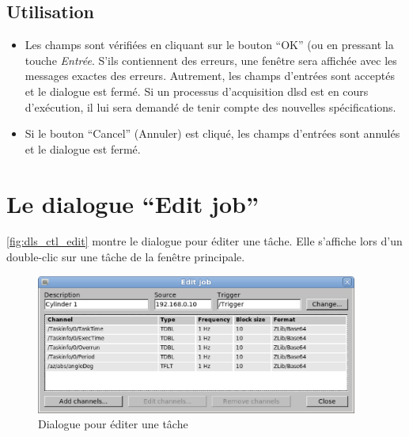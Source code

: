 \documentclass[a4paper,12pt,BCOR6mm,bibtotoc,idxtotoc]{scrbook}
\begin{document}
\subsection{Utilisation}

\begin{itemize}

\item Les champs sont v\'erifi\'ees en cliquant sur le bouton ``OK''
  (ou en pressant la touche \textit{Entr\'ee}. S'ils contiennent des
  erreurs, une fen\^etre sera affich\'ee avec les messages exactes des
  erreurs. Autrement, les champs d'entr\'ees sont accept\'es et le
  dialogue est ferm\'e. Si un processus d'acquisition dlsd
  est en cours d'ex\'ecution, il lui sera demand\'e de tenir compte
  des nouvelles sp\'ecifications.

\item Si le bouton ``Cancel'' (Annuler) est cliqu\'e, les champs
  d'entr\'ees sont annul\'es et le dialogue est ferm\'e.

\end{itemize}


\section{Le dialogue ``Edit job''}
\label{sec:manager_job_edit}

\autoref{fig:dls_ctl_edit} montre le dialogue pour \'editer une t\^ache. Elle
s'affiche lors d'un double-clic sur une t\^ache de la fen\^etre principale.

\begin{figure}[tbh]
  \begin{center}
    \includegraphics[width=300pt]{bilder/ctl_edit_en}
  \end{center}
  \caption{Dialogue pour \'editer une t\^ache}
  \label{fig:dls_ctl_edit}
\end{figure}

\end{document}
